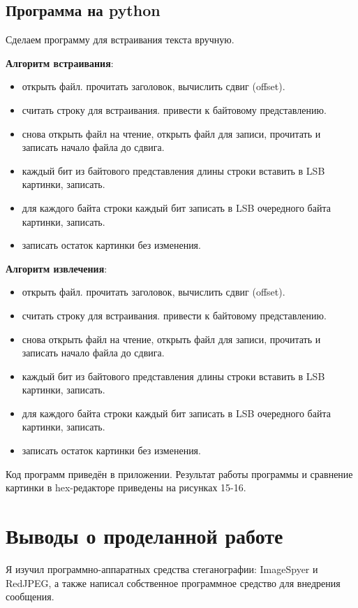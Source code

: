 \subsection{Программа на python}
Сделаем программу для встраивания текста вручную. 

\textbf{Алгоритм встраивания}:
\begin{itemize}
    \item открыть файл. прочитать заголовок, вычислить сдвиг (offset).
    \item считать строку для встраивания. привести к байтовому представлению.
    \item снова открыть файл на чтение, открыть файл для записи, прочитать и записать начало файла до сдвига.
    \item каждый бит из байтового представления длины строки вставить в LSB картинки, записать.
    \item для каждого байта строки каждый бит записать в LSB очередного байта картинки, записать.
    \item записать остаток картинки без изменения.
\end{itemize}

\textbf{Алгоритм извлечения}:
\begin{itemize}
    \item открыть файл. прочитать заголовок, вычислить сдвиг (offset).
    \item считать строку для встраивания. привести к байтовому представлению.
    \item снова открыть файл на чтение, открыть файл для записи, прочитать и записать начало файла до сдвига.
    \item каждый бит из байтового представления длины строки вставить в LSB картинки, записать.
    \item для каждого байта строки каждый бит записать в LSB очередного байта картинки, записать.
    \item записать остаток картинки без изменения.
\end{itemize}

Код программ приведён в приложении. Результат работы программы и сравнение картинки в hex-редакторе приведены на рисунках 15-16.

\FloatBarrier

\FloatBarrier
\clearpage

\section{Выводы о проделанной работе}
Я изучил программно-аппаратных средства стеганографии: ImageSpyer и RedJPEG, а также написал собственное программное средство для внедрения сообщения.

\clearpage